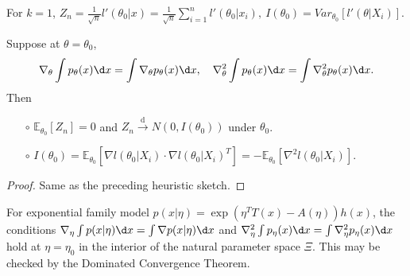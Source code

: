 \documentclass[a4paper]{article}
\begin{document}
\begin{note}
	For $k = 1$, $Z_n = \frac{1}{\sqrt{n}}l'(\theta_0|x)=\frac{1}{\sqrt{n}}\sum\limits_{i=1}^n l'(\theta_0|x_i), \ I(\theta_0) = Var_{\theta_0}[l'(\theta|X_i)]$.
\end{note}

\begin{prop}
	Suppose at $\theta = \theta_0$,
	\begin{equation*}
		\nabla_{\theta} \int p_{\theta}(x) \d x = \int \nabla_{\theta}p_{\theta}(x)\d x, \quad \nabla_{\theta}^2 \int p_{\theta}(x) \d x = \int \nabla_{\theta}^2 p_{\theta}(x)\d x.
	\end{equation*}
	Then
	\begin{itemize}
		\item[$\circ$] $\mathbb{E}_{\theta_0}[Z_n] = 0$ and $Z_n \stackrel{\text{d}}{\longrightarrow} N(0,I(\theta_0))$ under $\theta_0$.
		\item[$\circ$] $I(\theta_0) = \mathbb{E}_{\theta_0}\left[\nabla l(\theta_0|X_i) \cdot \nabla l(\theta_0|X_i)^T\right] = - \mathbb{E}_{\theta_0}[\nabla^2 l(\theta_0|X_i)]$. 
	\end{itemize}
\end{prop}

\begin{proof}
	Same as the preceding heuristic sketch.
\end{proof}

\begin{remark}
	For exponential family model $p(x|\eta) = \exp(\eta^TT(x)-A(\eta))h(x)$, the conditions $\nabla_{\eta} \int p(x|\eta) \d x = \int \nabla p(x|\eta)\d x$ and $\nabla_{\eta}^2 \int p_{\eta}(x) \d x = \int \nabla_{\eta}^2 p_{\eta}(x)\d x$ hold at $\eta = \eta_0$ in the interior of the natural parameter space $\Xi$. This may be checked by the Dominated Convergence Theorem.
\end{remark}
\end{document}
